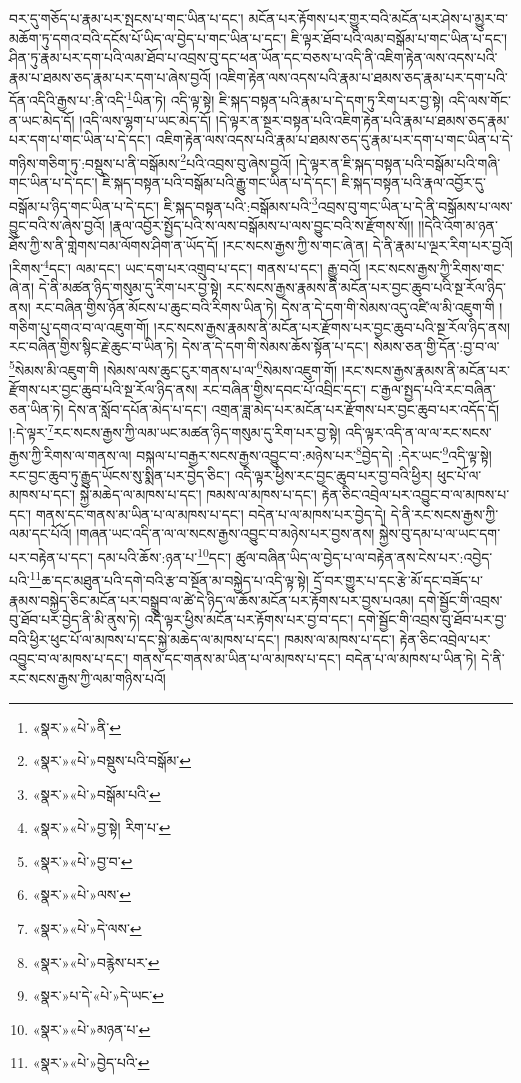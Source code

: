 བར་དུ་གཅོད་པ་རྣམ་པར་སྤངས་པ་གང་ཡིན་པ་དང་། མངོན་པར་རྟོགས་པར་གྱུར་བའི་མངོན་པར་ཤེས་པ་མྱུར་བ་མཆོག་ཏུ་དགའ་བའི་དངོས་པོ་ཡིད་ལ་བྱེད་པ་གང་ཡིན་པ་དང་། ཇི་ལྟར་ཐོབ་པའི་ལམ་བསྒོམ་པ་གང་ཡིན་པ་དང་། ཤིན་ཏུ་རྣམ་པར་དག་པའི་ལམ་ཐོབ་པ་འབྲས་བུ་དང་ཕན་ཡོན་དང་བཅས་པ་འདི་ནི་འཇིག་རྟེན་ལས་འདས་པའི་རྣམ་པ་ཐམས་ཅད་རྣམ་པར་དག་པ་ཞེས་བྱའོ། །འཇིག་རྟེན་ལས་འདས་པའི་རྣམ་པ་ཐམས་ཅད་རྣམ་པར་དག་པའི་དོན་འདིའི་རྒྱས་པ་:ནི་འདི་\footnote{«སྣར་»«པེ་»ནི་}ཡིན་ཏེ། འདི་ལྟ་སྟེ། ཇི་སྐད་བསྟན་པའི་རྣམ་པ་དེ་དག་ཏུ་རིག་པར་བྱ་སྟེ། འདི་ལས་གོང་ན་ཡང་མེད་དོ། །འདི་ལས་ལྷག་པ་ཡང་མེད་དོ། །དེ་ལྟར་ན་སྔར་བསྟན་པའི་འཇིག་རྟེན་པའི་རྣམ་པ་ཐམས་ཅད་རྣམ་པར་དག་པ་གང་ཡིན་པ་དེ་དང་། འཇིག་རྟེན་ལས་འདས་པའི་རྣམ་པ་ཐམས་ཅད་དུ་རྣམ་པར་དག་པ་གང་ཡིན་པ་དེ་གཉིས་གཅིག་ཏུ་:བསྡུས་པ་ནི་བསྒོམས་\footnote{«སྣར་»«པེ་»བསྡུས་པའི་བསྒོམ་}པའི་འབྲས་བུ་ཞེས་བྱའོ། །དེ་ལྟར་ན་ཇི་སྐད་བསྟན་པའི་བསྒོམ་པའི་གཞི་གང་ཡིན་པ་དེ་དང་། ཇི་སྐད་བསྟན་པའི་བསྒོམ་པའི་རྒྱུ་གང་ཡིན་པ་དེ་དང་། ཇི་སྐད་བསྟན་པའི་རྣལ་འབྱོར་དུ་བསྒོམ་པ་ཉིད་གང་ཡིན་པ་དེ་དང་། ཇི་སྐད་བསྟན་པའི་:བསྒོམས་པའི་\footnote{«སྣར་»«པེ་»བསྒོམ་པའི་}འབྲས་བུ་གང་ཡིན་པ་དེ་ནི་བསྒོམས་པ་ལས་བྱུང་བའི་ས་ཞེས་བྱའོ། །རྣལ་འབྱོར་སྤྱོད་པའི་ས་ལས་བསྒོམས་པ་ལས་བྱུང་བའི་ས་རྫོགས་སོ།། །།དེའི་འོག་མ་ཉན་ཐོས་ཀྱི་ས་ནི་གླེགས་བམ་ལོགས་ཤིག་ན་ཡོད་དོ། །རང་སངས་རྒྱས་ཀྱི་ས་གང་ཞེ་ན། དེ་ནི་རྣམ་པ་ལྔར་རིག་པར་བྱའོ། །རིགས་\footnote{«སྣར་»«པེ་»བྱ་སྟེ། རིག་པ་}དང་། ལམ་དང་། ཡང་དག་པར་འགྲུབ་པ་དང་། གནས་པ་དང་། རྒྱུ་བའོ། །རང་སངས་རྒྱས་ཀྱི་རིགས་གང་ཞེ་ན། དེ་ནི་མཚན་ཉིད་གསུམ་དུ་རིག་པར་བྱ་སྟེ། རང་སངས་རྒྱས་རྣམས་ནི་མངོན་པར་བྱང་ཆུབ་པའི་སྔ་རོལ་ཉིད་ནས། རང་བཞིན་གྱིས་ཉོན་མོངས་པ་ཆུང་བའི་རིགས་ཡིན་ཏེ། དེས་ན་དེ་དག་གི་སེམས་འདུ་འཛི་ལ་མི་འཇུག་གི །གཅིག་པུ་དགའ་བ་ལ་འཇུག་གོ། །རང་སངས་རྒྱས་རྣམས་ནི་མངོན་པར་རྫོགས་པར་བྱང་ཆུབ་པའི་སྔ་རོལ་ཉིད་ནས། རང་བཞིན་གྱིས་སྙིང་རྗེ་ཆུང་བ་ཡིན་ཏེ། དེས་ན་དེ་དག་གི་སེམས་ཆོས་སྟོན་པ་དང་། སེམས་ཅན་གྱི་དོན་:བྱ་བ་ལ་\footnote{«སྣར་»«པེ་»བྱ་བ་}སེམས་མི་འཇུག་གི །སེམས་ལས་ཆུང་ངུར་གནས་པ་ལ་\footnote{«སྣར་»«པེ་»ལས་}སེམས་འཇུག་གོ། །རང་སངས་རྒྱས་རྣམས་ནི་མངོན་པར་རྫོགས་པར་བྱང་ཆུབ་པའི་སྔ་རོལ་ཉིད་ནས། རང་བཞིན་གྱིས་དབང་པོ་འབྲིང་དང་། ང་རྒྱལ་སྤྱད་པའི་རང་བཞིན་ཅན་ཡིན་ཏེ། དེས་ན་སློབ་དཔོན་མེད་པ་དང་། འགྲན་ཟླ་མེད་པར་མངོན་པར་རྫོགས་པར་བྱང་ཆུབ་པར་འདོད་དོ། །:དེ་ལྟར་\footnote{«སྣར་»«པེ་»དེ་ལས་}རང་སངས་རྒྱས་ཀྱི་ལམ་ཡང་མཚན་ཉིད་གསུམ་དུ་རིག་པར་བྱ་སྟེ། འདི་ལྟར་འདི་ན་ལ་ལ་རང་སངས་རྒྱས་ཀྱི་རིགས་ལ་གནས་ལ། བསྐལ་པ་བརྒྱར་སངས་རྒྱས་འབྱུང་བ་:མཉེས་པར་\footnote{«སྣར་»«པེ་»བརྙེས་པར་}བྱེད་དེ། :དེར་ཡང་\footnote{«སྣར་»པ་དེ་«པེ་»དེ་ཡང་}འདི་ལྟ་སྟེ། རང་བྱང་ཆུབ་ཏུ་རྒྱུད་ཡོངས་སུ་སྨིན་པར་བྱེད་ཅིང་། འདི་ལྟར་ཕྱིས་རང་བྱང་ཆུབ་པར་བྱ་བའི་ཕྱིར། ཕུང་པོ་ལ་མཁས་པ་དང་། སྐྱེ་མཆེད་ལ་མཁས་པ་དང་། ཁམས་ལ་མཁས་པ་དང་། རྟེན་ཅིང་འབྲེལ་པར་འབྱུང་བ་ལ་མཁས་པ་དང་། གནས་དང་གནས་མ་ཡིན་པ་ལ་མཁས་པ་དང་། བདེན་པ་ལ་མཁས་པར་བྱེད་དེ། དེ་ནི་རང་སངས་རྒྱས་ཀྱི་ལམ་དང་པོའོ། །གཞན་ཡང་འདི་ན་ལ་ལ་སངས་རྒྱས་འབྱུང་བ་མཉེས་པར་བྱས་ནས། སྐྱེས་བུ་དམ་པ་ལ་ཡང་དག་པར་བརྟེན་པ་དང་། དམ་པའི་ཆོས་:ཉན་པ་\footnote{«སྣར་»«པེ་»མཉན་པ་}དང་། ཚུལ་བཞིན་ཡིད་ལ་བྱེད་པ་ལ་བརྟེན་ནས་ངེས་པར་:འབྱེད་པའི་\footnote{«སྣར་»«པེ་»བྱེད་པའི་}ཆ་དང་མཐུན་པའི་དགེ་བའི་རྩ་བ་སྔོན་མ་བསྐྱེད་པ་འདི་ལྟ་སྟེ། དྲོ་བར་གྱུར་པ་དང་རྩེ་མོ་དང་བཟོད་པ་རྣམས་བསྐྱེད་ཅིང་མངོན་པར་བསྒྲུབ་ལ་ཚེ་དེ་ཉིད་ལ་ཆོས་མངོན་པར་རྟོགས་པར་བྱས་པའམ། དགེ་སྦྱོང་གི་འབྲས་བུ་ཐོབ་པར་བྱེད་ནི་མི་ནུས་ཏེ། འདི་ལྟར་ཕྱིས་མངོན་པར་རྟོགས་པར་བྱ་བ་དང་། དགེ་སྦྱོང་གི་འབྲས་བུ་ཐོབ་པར་བྱ་བའི་ཕྱིར་ཕུང་པོ་ལ་མཁས་པ་དང་སྐྱེ་མཆེད་ལ་མཁས་པ་དང་། ཁམས་ལ་མཁས་པ་དང་། རྟེན་ཅིང་འབྲེལ་པར་འབྱུང་བ་ལ་མཁས་པ་དང་། གནས་དང་གནས་མ་ཡིན་པ་ལ་མཁས་པ་དང་། བདེན་པ་ལ་མཁས་པ་ཡིན་ཏེ། དེ་ནི་རང་སངས་རྒྱས་ཀྱི་ལམ་གཉིས་པའོ། 